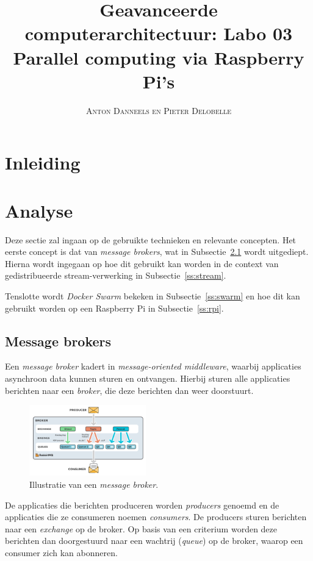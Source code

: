 \documentclass[twocolumn, a4paper]{article}
\begin{document}
\title{Geavanceerde computerarchitectuur: Labo 03 \\ 
\large{Parallel computing via Raspberry Pi's}}
\author{\textsc{Anton Danneels en Pieter Delobelle}}
\date{}
\maketitle

\section{Inleiding}

\section{Analyse}
Deze sectie zal ingaan op de gebruikte technieken en relevante concepten. Het eerste concept is dat van \emph{message brokers}, wat in Subsectie~\ref{ss:broker} wordt uitgediept. Hierna wordt ingegaan op hoe dit gebruikt kan worden in de context van gedistribueerde stream-verwerking in Subsectie~\ref{ss:stream}. 

Tenslotte wordt \emph{Docker Swarm} bekeken in Subsectie~\ref{ss:swarm} en hoe dit kan gebruikt worden op een Raspberry Pi in Subsectie~\ref{ss:rpi}.

\subsection{Message brokers}\label{ss:broker}
Een \emph{message broker} kadert in \emph{message-oriented middleware}, waarbij applicaties asynchroon data kunnen sturen en ontvangen. Hierbij sturen alle applicaties berichten naar een \emph{broker}, die deze berichten dan weer doorstuurt.

\begin{figure}[htb]
    \centering
    \includegraphics[width=0.45\textwidth]{exchanges-topic-fanout-direct.png}
    \caption{Illustratie van een \emph{message broker}.}\label{fig:broker}
\end{figure}

De applicaties die berichten produceren worden \emph{producers} genoemd en de applicaties die ze consumeren noemen \emph{consumers}. De producers sturen berichten naar een \emph{exchange} op de broker. Op basis van een criterium worden deze berichten dan doorgestuurd naar een wachtrij (\emph{queue}) op de broker, waarop een consumer zich kan abonneren.
\end{document}
